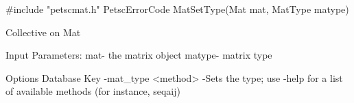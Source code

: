 #include "petscmat.h"
PetscErrorCode  MatSetType(Mat mat, MatType matype)

Collective on Mat

Input Parameters:
mat- the matrix object
matype- matrix type

Options Database Key
-mat_type <method> -Sets the type; use -help for a list of available methods (for instance, seqaij)
